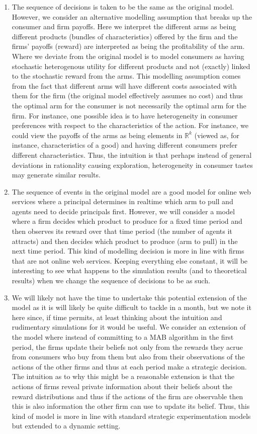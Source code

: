 \documentclass[a4paper]{article}
\begin{document}
\begin{enumerate}
\begin{enumerate}
\item The sequence of decisions is taken to be the same as the original model. However, we consider an alternative modelling assumption that breaks up the consumer and firm payoffs. Here we interpret the different arms as being different products (bundles of characteristics) offered by the firm and the firms' payoffs (reward) are interpreted as being the profitability of the arm. Where we deviate from the original model is to model consumers as having stochastic heterogenous utility for different products and not (exactly) linked to the stochastic reward from the arms. This modelling assumption comes from the fact that different arms will have different costs associated with them for the firm (the original model effectively assumes no cost) and thus the optimal arm for the consumer is not necessarily the optimal arm for the firm. For instance, one possible idea is to have heterogeneity in consumer preferences with respect to the characteristics of the action. For instance, we could view the payoffs of the arms as being elements in $\mathbb{R}^{k}$ (viewed as, for instance, characteristics of a good) and having different consumers prefer different characteristics. Thus, the intuition is that perhaps instead of general deviations in rationality causing exploration, heterogeneity in consumer tastes may generate similar results.
\item The sequence of events in the original model are a good model for online web services where a principal determines in realtime which arm to pull and agents need to decide principals first. However, we will consider a model where a firm decides which product to produce for a fixed time period and then observes its reward over that time period (the number of agents it attracts) and then decides which product to produce (arm to pull) in the next time period. This kind of modelling decision is more in line with firms that are not online web services. Keeping everything else constant, it will be interesting to see what happens to the simulation results (and to theoretical results) when we change the sequence of decisions to be as such. 
\item We will likely not have the time to undertake this potential extension of the model as it is will likely be quite difficult to tackle in a month, but we note it here since, if time permits, at least thinking about the intuition and rudimentary simulations for it would be useful. We consider an extension of the model where instead of committing to a MAB algorithm in the first period, the firms update their beliefs not only from the rewards they acrue from consumers who buy from them but also from their observations of the actions of the other firms and thus at each period make a strategic decision. The intuition as to why this might be a reasonable extension is that the actions of firms reveal private information about their beliefs about the reward distributions and thus if the actions of the firm are observable then this is also information the other firm can use to update its belief. Thus, this kind of model is more in line with standard strategic experimentation models but extended to a dynamic setting.
\end{enumerate} 
\end{enumerate}
\end{document}
